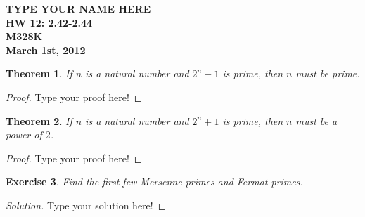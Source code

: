 \documentclass[12pt,leqno]{article}
\numberwithin{equation}{section}
\newtheorem{thm}{Theorem}[section]
\newtheorem{exer}[thm]{Exercise}
\theoremstyle{definition}
\begin{document}
\thispagestyle{plain}
\begin{flushright}
\large{\textbf{TYPE YOUR NAME HERE \\
HW 12: 2.42-2.44\\
M328K \\
March 1st, 2012 \\}}
\end{flushright}

\markboth{}{} \setcounter{section}{0} \baselineskip=18pt

\setcounter{tocdepth}{4}



\setcounter{section}{2}

\setcounter{thm}{41}


\begin{thm}
If $n$ is a natural number and $2^n - 1$ is prime, then $n$ must be
prime.
\end{thm}

\begin{proof}[Proof]
Type your proof here!
\end{proof}



\begin{thm}
If $n$ is a natural number and $2^n+1$ is prime, then $n$ must be a
power of $2$.
\end{thm}

\begin{proof}[Proof]
Type your proof here!
\end{proof}



\begin{exer}
Find the first few Mersenne primes and Fermat primes.
\end{exer}

\begin{proof}[Solution]
Type your solution here!
\end{proof}
\end{document}
